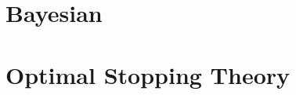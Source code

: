 \documentclass[11pt]{article}
\begin{document}
\section{Bayesian}



\section{Optimal Stopping Theory}





\end{document}
